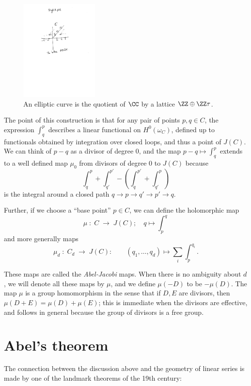 \begin{figure}
 \caption{An elliptic curve is the quotient of $\CC$ by a lattice $\ZZ\oplus \ZZ\tau$.}
\centerline {\includegraphics[height=2in]{"Fig4.3.pdf"}}
\end{figure}


The point of this construction is that for any pair of points $p, q \in C$, the expression $\int_q^p$ describes a linear functional on $H^0(\omega_C)$, defined up to functionals obtained by integration over closed loops, and thus a point of $J(C)$. We can think of $p-q$ as a divisor of
degree 0, and the map $p-q \mapsto \int_q^p$ extends to a well defined map $\mu_0$ from divisors of degree 0 to $J(C)$ because
$$
\int_q^p +\int_{q'}^{p'} - (\int_q^{p'} +\int_{q'}^p) 
$$
is the integral around a closed path $q\to p\to q'\to p' \to q$.

Further, if we choose a ``base point''  $p\in C$, we can define the holomorphic map
$$
\mu \; : \; C \; \to \; J(C); \quad q\mapsto \int_{p}^{q}
$$
and more generally maps
$$
\mu_d \; : \; C_d \; \to \; J(C): \quad  \quad (q_1,\dots, q_d) \mapsto \sum_i \int_{p}^{q_i}.
$$

These maps are called the \emph{Abel-Jacobi} maps. When there is no ambiguity about $d$, we will denote all these maps  by $\mu$,  and  
we define $\mu(-D)$ to be $-\mu(D)$. 
The map $\mu$ is a group homomorphism in the sense that if $D, E$ are divisors, then
$\mu (D+E) = \mu(D) + \mu(E)$; this is immediate when the divisors are effective, and 
follows in general because the group of divisors is a free group.

\section{Abel's theorem}
 The connection between the discussion above and the geometry of linear series is made by one of the landmark theorems of the 19th century:

